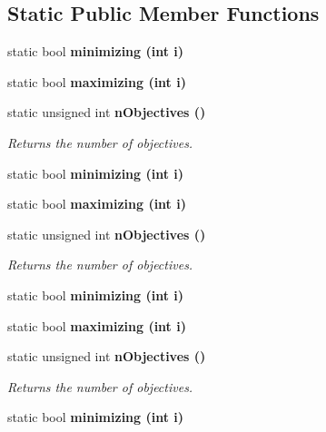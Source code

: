 \subsection*{Static Public Member Functions}
\begin{CompactItemize}
\item 
static bool \bf{minimizing} (int i)\label{classObjectiveVectorTraits_52dc1c3dd95f37fe256708f40189a6fd}

\item 
static bool \bf{maximizing} (int i)\label{classObjectiveVectorTraits_69ddc04a4bf7b842f5457f7cff09c479}

\item 
static unsigned int \bf{n\-Objectives} ()\label{classObjectiveVectorTraits_8f8cb44cfe76117ab1c5624e4fced91f}

\begin{CompactList}\small\item\em Returns the number of objectives. \item\end{CompactList}\item 
static bool \bf{minimizing} (int i)\label{classObjectiveVectorTraits_52dc1c3dd95f37fe256708f40189a6fd}

\item 
static bool \bf{maximizing} (int i)\label{classObjectiveVectorTraits_69ddc04a4bf7b842f5457f7cff09c479}

\item 
static unsigned int \bf{n\-Objectives} ()\label{classObjectiveVectorTraits_8f8cb44cfe76117ab1c5624e4fced91f}

\begin{CompactList}\small\item\em Returns the number of objectives. \item\end{CompactList}\item 
static bool \bf{minimizing} (int i)\label{classObjectiveVectorTraits_52dc1c3dd95f37fe256708f40189a6fd}

\item 
static bool \bf{maximizing} (int i)\label{classObjectiveVectorTraits_69ddc04a4bf7b842f5457f7cff09c479}

\item 
static unsigned int \bf{n\-Objectives} ()\label{classObjectiveVectorTraits_8f8cb44cfe76117ab1c5624e4fced91f}

\begin{CompactList}\small\item\em Returns the number of objectives. \item\end{CompactList}\item 
static bool \bf{minimizing} (int i)\label{classObjectiveVectorTraits_52dc1c3dd95f37fe256708f40189a6fd}


\end{CompactItemize}
